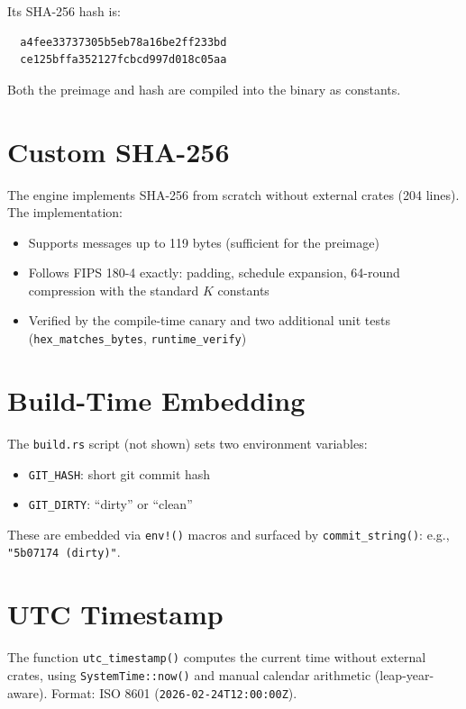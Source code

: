 \documentclass[11pt, a4paper, openany]{book}
\newcommand{\code}[1]{\texttt{#1}}
\newcommand{\func}[1]{\texttt{\color{structure}#1}}
\newcounter{thm}[chapter]
\begin{document}
Its SHA-256 hash is:

\begin{verbatim}
  a4fee33737305b5eb78a16be2ff233bd
  ce125bffa352127fcbcd997d018c05aa
\end{verbatim}

Both the preimage and hash are compiled into the binary as constants.

\section{Custom SHA-256}

The engine implements SHA-256 from scratch without external crates (204 lines).
The implementation:
\begin{itemize}
  \item Supports messages up to 119 bytes (sufficient for the preimage)
  \item Follows FIPS 180-4 exactly: padding, schedule expansion, 64-round
        compression with the standard $K$ constants
  \item Verified by the compile-time canary and two additional unit tests
        (\func{hex\_matches\_bytes}, \func{runtime\_verify})
\end{itemize}

\section{Build-Time Embedding}

The \code{build.rs} script (not shown) sets two environment variables:
\begin{itemize}
  \item \code{GIT\_HASH}: short git commit hash
  \item \code{GIT\_DIRTY}: ``dirty'' or ``clean''
\end{itemize}
These are embedded via \code{env!()} macros and surfaced by
\func{commit\_string()}: e.g., \code{"5b07174 (dirty)"}.

\section{UTC Timestamp}

The function \func{utc\_timestamp()} computes the current time without external
crates, using \code{SystemTime::now()} and manual calendar arithmetic
(leap-year-aware).  Format: ISO 8601 (\code{2026-02-24T12:00:00Z}).


\end{document}
